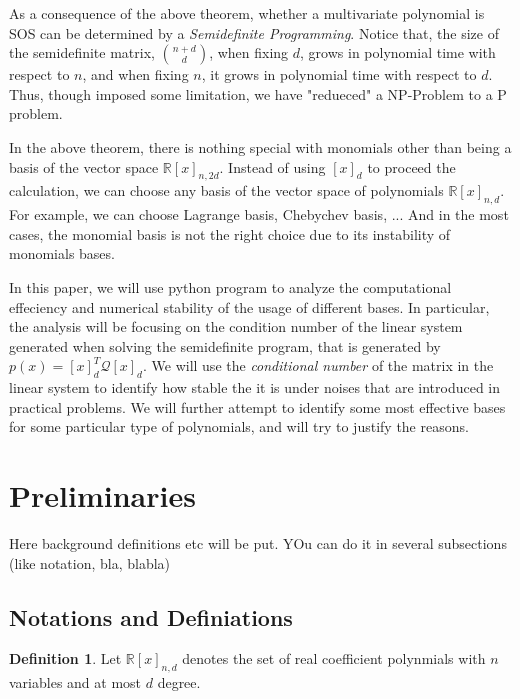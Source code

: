 \documentclass[12pt]{amsart}
\numberwithin{equation}{section}
\theoremstyle{definition}
\newtheorem{definition}[thm]{Definition}
\numberwithin{thm}{section}
\begin{document}
\cite{Blekherman:Parrilo:Thomas}

\cite{Laurent:Survey}

As a consequence of the above theorem, whether a multivariate polynomial is SOS can be determined 
by a \emph{Semidefinite Programming}. Notice that, the size of the semidefinite matrix,
${n+d \choose d}$, when fixing $d$, grows in polynomial time with respect to $n$, and when 
fixing $n$, it grows in polynomial time with respect to $d$. Thus, though imposed some 
limitation, we have "redueced" a NP-Problem to a P problem. 

In the above theorem, there is nothing special with monomials other than being a basis of the vector space $\mathbb{R}[x]_{n,2d}$. 
Instead of using $[x]_d$ to proceed the calculation,
we can choose any basis of the vector space of polynomials $\mathbb{R}[x]_{n,d}$. 
For example, we can choose Lagrange basis, Chebychev basis, ... And in the most cases,
the monomial basis is not the right choice due to its instability of monomials bases.

In this paper, we will use python program to analyze the computational effeciency and 
numerical stability of the usage of different bases. In particular, the analysis will
be focusing on the condition number of the linear system generated when solving the 
semidefinite program, that is generated by $p(x) = [x]_d^T \mathcal{Q} [x]_d $. 
We will use the \emph{conditional number} of the matrix in the linear system to identify how stable the
it is under noises that are introduced in practical problems.  
We will further attempt to identify some most effective bases for some particular
type of polynomials, and will try to justify the reasons.  


\section{Preliminaries}
\label{Sec:Preliminaries}

Here background definitions etc will be put. 
YOu can do it in several subsections (like notation, bla, blabla)

\subsection{Notations and Definiations}
\label{Sec:Notations and Definiations}

\begin{definition}
     Let $\mathbb{R}[x]_{n,d}$ denotes the set of real coefficient 
     polynmials with $n$ variables and at most $d$ degree.
\end{definition}
\end{document}

